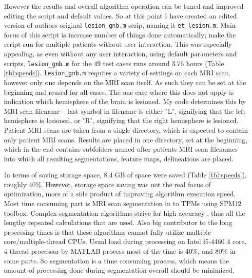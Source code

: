 \documentclass[12pt]{article}
\begin{document}
However the results and overall algorithm operation can be tuned and improved editing the script and default values. So at this point I have created an edited version of authors original \texttt{lesion\_gnb.m} scrip, naming it \texttt{et\_lesion.m}. Main focus of this script is increase number of things done automatically; make the script run for multiple patients without user interaction. This was especially appealing, as even without any user interaction, using default parameters and scripts, \texttt{lesion\_gnb.m} for the 49 test cases runs around 3.76 hours (Table \ref{tbl:speeds}). \texttt{lesion\_gnb.m} requires a variety of settings on each MRI scan, however only one depends on the MRI scan itself. As such they can be set at the beginning and reused for all cases. The one case where this does not apply is indication which hemisphere of the brain is lesioned. My code determines this by MRI scan filename – last symbol in filename is either "L", signifying that the left hemisphere is lesioned, or "R", signifying that the right hemisphere is lesioned. Patient MRI scans are taken from a single directory, which is expected to contain only patient MRI scans. Results are placed in one directory, set at the beginning, which in the end contains subfolders named after patients MRI scan filenames into which all resulting segmentations, feature maps, delineations are placed.

In terms of saving storage space, 8.4 GB of space were saved (Table \ref{tbl:speeds}), roughly 40\%. However, storage space saving was not the real focus of optimization, more of a side product of improving algorithm execution speed. Most time consuming part is MRI scan segmentation in to TPMs using SPM12 toolbox. Complex segmentation algorithms strive for high accuracy \cite{Ashburner2005}, thus all the lengthy repeated calculations that are used. Also big contributor to the long processing times is that these algorithms cannot fully utilize multiple-core/multiple-thread CPUs. Usual load during processing on Intel i5-4460 4 core, 4 thread processor by MATLAB process most of the time is 40\%, and 80\% in some parts. So segmentation is a time consuming process, which means the amount of processing done during segmentation overall should be minimized. 
\end{document}
